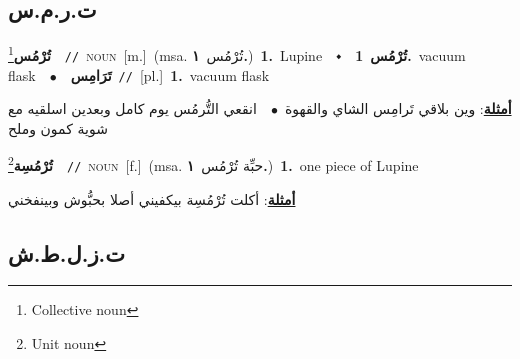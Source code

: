 \documentclass[10pt,a4paper,twoside]{article} %
\begin{document}
\begin{multicols}{2}
\vspace{-3mm}
\subsection*{\color{blue}\foreignlanguage{arabic}{ت.ر.م.س}\color{blue}{ (ntws)}} 

{\setlength\topsep{0pt}\textbf{\foreignlanguage{arabic}{تُرْمُس}}\footnote{Collective noun}\ \ {\color{gray}\texttt{//}\color{black}}\ \textsc{noun}\ [m.]\ \color{gray}(msa. \foreignlanguage{arabic}{تُرْمُس}~\foreignlanguage{arabic}{\textbf{١.}})\color{black}\ \textbf{1.}~Lupine\ \ $\smblkdiamond$\ \ \setlength\topsep{0pt}\textbf{\foreignlanguage{arabic}{تُرْمُس}}\ \textbf{1.}~vacuum flask\ \ $\bullet$\ \ \setlength\topsep{0pt}\textbf{\foreignlanguage{arabic}{تَرَامِس}}\ {\color{gray}\texttt{//}\color{black}}\ [pl.]\ \textbf{1.}~vacuum flask\  \begin{flushright}\color{gray}\foreignlanguage{arabic}{\textbf{\underline{\foreignlanguage{arabic}{أمثلة}}}: وين بلاقي تَرامِس الشاي والقهوة\ $\bullet$\ \  انقعي التُّرمُس يوم كامل وبعدين اسلقيه مع شوية كمون وملح}\end{flushright}\color{black}} \vspace{2mm}

{\setlength\topsep{0pt}\textbf{\foreignlanguage{arabic}{تُرْمُسِة}}\footnote{Unit noun}\ \ {\color{gray}\texttt{//}\color{black}}\ \textsc{noun}\ [f.]\ \color{gray}(msa. \foreignlanguage{arabic}{حبِّة تُرْمُس}~\foreignlanguage{arabic}{\textbf{١.}})\color{black}\ \textbf{1.}~one piece of Lupine\  \begin{flushright}\color{gray}\foreignlanguage{arabic}{\textbf{\underline{\foreignlanguage{arabic}{أمثلة}}}: أكلت تُرْمُسِة بيكفيني أصلا بحبُّوش وبينفخني}\end{flushright}\color{black}} \vspace{2mm}

\vspace{-3mm}
\subsection*{\color{blue}\foreignlanguage{arabic}{ت.ز.ل.ط.ش}\color{blue}{ (ntws)}} 


\end{multicols}
\end{document}
